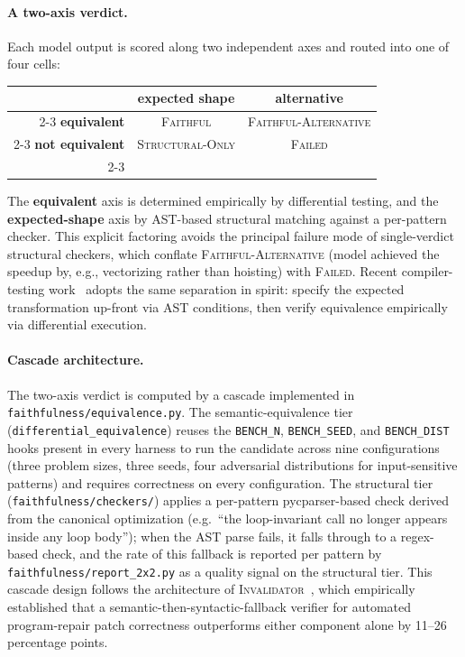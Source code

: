 \paragraph{A two-axis verdict.} Each model output is scored along two independent axes and routed into one of four cells:

\begin{center}
\begin{tabular}{r|c|c|}
\multicolumn{1}{r}{} & \multicolumn{1}{c}{\textbf{expected shape}} & \multicolumn{1}{c}{\textbf{alternative}} \\ \cline{2-3}
\textbf{equivalent}     & \textsc{Faithful}         & \textsc{Faithful-Alternative} \\ \cline{2-3}
\textbf{not equivalent} & \textsc{Structural-Only}  & \textsc{Failed}               \\ \cline{2-3}
\end{tabular}
\end{center}

The \textbf{equivalent} axis is determined empirically by differential testing, and the \textbf{expected-shape} axis by AST-based structural matching against a per-pattern checker. This explicit factoring avoids the principal failure mode of single-verdict structural checkers, which conflate \textsc{Faithful-Alternative} (model achieved the speedup by, e.g., vectorizing rather than hoisting) with \textsc{Failed}. Recent compiler-testing work~\cite{wu2025fse} adopts the same separation in spirit: specify the expected transformation up-front via AST conditions, then verify equivalence empirically via differential execution.

\paragraph{Cascade architecture.} The two-axis verdict is computed by a cascade implemented in \texttt{faithfulness/equivalence.py}. The semantic-equivalence tier (\texttt{differential\_equivalence}) reuses the \texttt{BENCH\_N}, \texttt{BENCH\_SEED}, and \texttt{BENCH\_DIST} hooks present in every harness to run the candidate across nine configurations (three problem sizes, three seeds, four adversarial distributions for input-sensitive patterns) and requires correctness on every configuration. The structural tier (\texttt{faithfulness/checkers/}) applies a per-pattern pycparser-based check derived from the canonical optimization (e.g.\ ``the loop-invariant call no longer appears inside any loop body''); when the AST parse fails, it falls through to a regex-based check, and the rate of this fallback is reported per pattern by \texttt{faithfulness/report\_2x2.py} as a quality signal on the structural tier. This cascade design follows the architecture of \textsc{Invalidator}~\cite{lecong2023invalidator}, which empirically established that a semantic-then-syntactic-fallback verifier for automated program-repair patch correctness outperforms either component alone by 11--26 percentage points.

